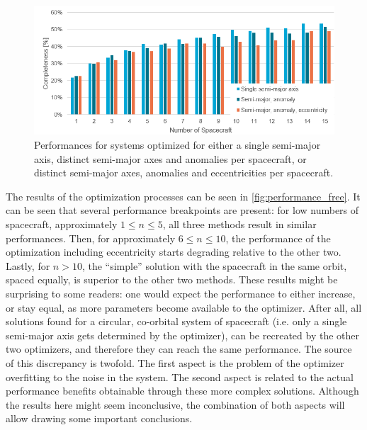 \begin{figure}[htbp]
 \centering
 \includegraphics[width=1.0\textwidth]{img/performance_free.png}
 \caption{Performances for systems optimized for either a single semi-major axis, distinct semi-major axes and anomalies per spacecraft, or distinct semi-major axes, anomalies and eccentricities per spacecraft.}
 \label{fig:performance_free}
\end{figure}
The results of the optimization processes can be seen in \autoref{fig:performance_free}. It can be seen that several performance breakpoints are present: for low numbers of spacecraft, approximately $1 \leq n \leq 5$, all three methods result in similar performances. Then, for approximately $6 \leq n \leq 10$, the performance of the optimization including eccentricity starts degrading relative to the other two. Lastly, for $n > 10$, the ``simple'' solution with the spacecraft in the same orbit, spaced equally, is superior to the other two methods. These results might be surprising to some readers: one would expect the performance to either increase, or stay equal, as more parameters become available to the optimizer. After all, all solutions found for a circular, co-orbital system of spacecraft (i.e. only a single semi-major axis gets determined by the optimizer), can be recreated by the other two optimizers, and therefore they can reach the same performance. The source of this discrepancy is twofold. The first aspect is the problem of the optimizer overfitting to the noise in the system. The second aspect is related to the actual performance benefits obtainable through these more complex solutions. Although the results here might seem inconclusive, the combination of both aspects will allow drawing some important conclusions.\\

